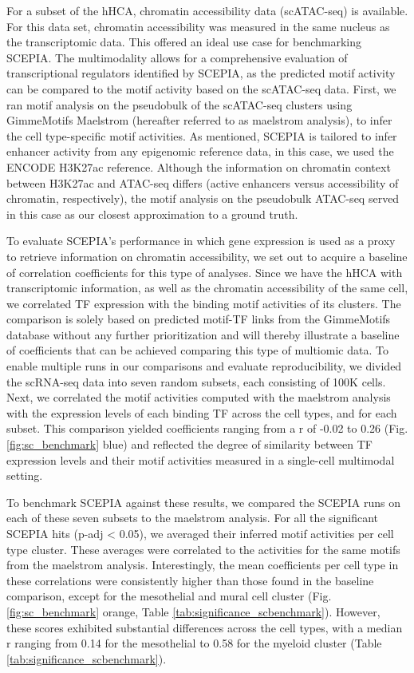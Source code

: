 For a subset of the hHCA, chromatin accessibility data (scATAC-seq) is available. For this data set, chromatin accessibility was measured in the same nucleus as the transcriptomic data. This offered an ideal use case for benchmarking SCEPIA. The multimodality allows for a comprehensive evaluation of transcriptional regulators identified by SCEPIA, as the predicted motif activity can be compared to the motif activity based on the scATAC-seq data. First, we ran motif analysis on the pseudobulk of the scATAC-seq clusters using GimmeMotifs Maelstrom\cite{Bruse_2018} (hereafter referred to as maelstrom analysis), to infer the cell type-specific motif activities. As mentioned, SCEPIA is tailored to infer enhancer activity from any epigenomic reference data, in this case, we used the ENCODE H3K27ac reference. Although the information on chromatin context between H3K27ac and ATAC-seq differs (active enhancers versus accessibility of chromatin, respectively), the motif analysis on the pseudobulk ATAC-seq served in this case as our closest approximation to a ground truth. 

To evaluate SCEPIA's performance in which gene expression is used as a proxy to retrieve information on chromatin accessibility, we set out to acquire a baseline of correlation coefficients for this type of analyses. Since we have the hHCA with transcriptomic information, as well as the chromatin accessibility of the same cell, we correlated TF expression with the binding motif activities of its clusters. The comparison is solely based on predicted motif-TF links from the GimmeMotifs database without any further prioritization and will thereby illustrate a baseline of coefficients that can be achieved comparing this type of multiomic data. To enable multiple runs in our comparisons and evaluate reproducibility, we divided the scRNA-seq data into seven random subsets, each consisting of 100K cells. Next, we correlated the motif activities computed with the maelstrom analysis with the expression levels of each binding TF across the cell types, and for each subset. This comparison yielded coefficients ranging from a r of -0.02 to 0.26 (Fig. \ref{fig:sc_benchmark} blue) and reflected the degree of similarity between TF expression levels and their motif activities measured in a single-cell multimodal setting.

To benchmark SCEPIA against these results, we compared the SCEPIA runs on each of these seven subsets to the maelstrom analysis. For all the significant SCEPIA hits (p-adj < 0.05), we averaged their inferred motif activities per cell type cluster. These averages were correlated to the activities for the same motifs from the maelstrom analysis. Interestingly, the mean coefficients per cell type in these correlations were consistently higher than those found in the baseline comparison, except for the mesothelial and mural cell cluster (Fig. \ref{fig:sc_benchmark} orange, Table \ref{tab:significance_scbenchmark}). However, these scores exhibited substantial differences across the cell types, with a median r ranging from 0.14 for the mesothelial to 0.58 for the myeloid cluster (Table \ref{tab:significance_scbenchmark}).

